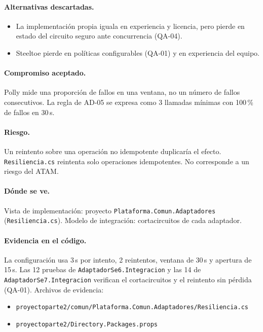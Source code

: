 \paragraph{Alternativas descartadas.}
\begin{itemize}
  \item La implementación propia iguala en experiencia y licencia, pero pierde en estado del circuito seguro ante concurrencia (QA-04).
  \item Steeltoe pierde en políticas configurables (QA-01) y en experiencia del equipo.
\end{itemize}

\paragraph{Compromiso aceptado.} Polly mide una proporción de fallos en una ventana, no un número de fallos consecutivos.
La regla de AD-05 se expresa como 3 llamadas mínimas con 100\,\% de fallos en 30\,s.

\paragraph{Riesgo.} Un reintento sobre una operación no idempotente duplicaría el efecto.
\texttt{Resiliencia.cs} reintenta solo operaciones idempotentes.
No corresponde a un riesgo del ATAM.

\paragraph{Dónde se ve.} Vista de implementación: proyecto \texttt{Plataforma.Comun.Adaptadores} (\texttt{Resiliencia.cs}).
Modelo de integración: cortacircuitos de cada adaptador.

\paragraph{Evidencia en el código.} La configuración usa 3\,s por intento, 2 reintentos, ventana de 30\,s y apertura de 15\,s. Las 12 pruebas de \texttt{AdaptadorSe6.Integracion} y las 14 de \texttt{AdaptadorSe7.Integracion} verifican el cortacircuitos y el reintento sin pérdida (QA-01).
Archivos de evidencia:
{\raggedright
\begin{itemize}
  \item \texttt{proyectoparte2/\br{}comun/\br{}Plataforma.Comun.Adaptadores/\br{}Resiliencia.cs}
  \item \texttt{proyectoparte2/\br{}Directory.Packages.props}
\end{itemize}
\par}

